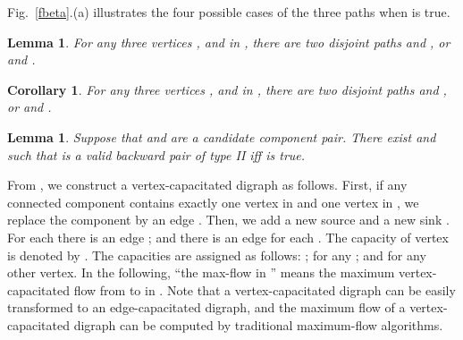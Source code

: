 \documentclass[review]{elsarticle}
\def\squarebox#1{\hbox to #1{\hfill\vbox to #1{\vfill}}}
\renewcommand{\qed}{\hspace*{\fill}
            \vbox{\hrule\hbox{\vrule\squarebox{.667em}\vrule}\hrule}\smallskip\newline}
\newtheorem{lem}[thm]{Lemma}
\newtheorem{cor}[thm]{Corollary}
\begin{document}
Fig.~\ref{fbeta}.(a) illustrates the four possible cases of the
three paths when  is true.
\begin{lem}\label{3v2path}
For any three vertices ,  and  in , there are
two disjoint paths  and , or  and
.
\end{lem}
\begin{cor}\label{3v2pathb}
For any three vertices ,  and  in , there are
two disjoint paths  and , or  and
.
\end{cor}

\begin{lem}\label{type2iff}
Suppose that  and  are a candidate component pair. There
exist  and  such that  is a valid
backward pair of type II iff  is true.
\end{lem}


From , we construct a vertex-capacitated digraph 
as follows. First, if any connected component contains exactly one
vertex  in  and one vertex  in , we replace the
component by an edge . Then, we add a new source  and a
new sink . For each  there is an edge ; and
there is an edge  for each . The capacity of
vertex  is denoted by . The capacities are assigned as
follows: ;  for any ; and  for any other vertex. In the following, ``the
max-flow in '' means the maximum vertex-capacitated flow
from  to  in . Note that a vertex-capacitated
digraph can be easily transformed to an edge-capacitated digraph,
and the maximum flow of a vertex-capacitated digraph can be computed
by traditional maximum-flow algorithms.
\end{document}
